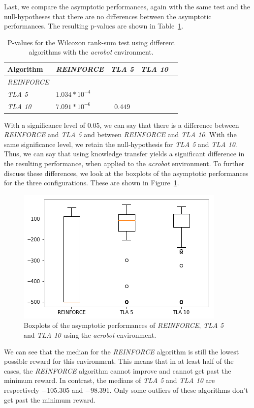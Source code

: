 Last, we compare the asymptotic performances, again with the same test and the null-hypotheses that there are no differences between the asymptotic performances. The resulting p-values are shown in Table~\ref{tab:nosparse:asymp:pvalues}.
\begin{table}[htb]
    \centering
    \begin{tabular}{llccc}
    \hline
    Algorithm & \textit{REINFORCE} & \textit{TLA 5} & \textit{TLA 10} \\
    \hline
       \textit{REINFORCE}  & & & \\
       \textit{TLA 5} & $1.034*10^{-4}$ & & \\
       \textit{TLA 10} & $7.091*10^{-6}$ & $0.449$ & \\
    \hline
    \end{tabular}
    \caption{P-values for the Wilcoxon rank-sum test using different algorithms with the \textit{acrobot} environment.}
    \label{tab:nosparse:asymp:pvalues}
\end{table}

With a significance level of $0.05$, we can say that there is a difference between \textit{REINFORCE} and \textit{TLA 5} and between \textit{REINFORCE} and \textit{TLA 10}.
With the same significance level, we retain the null-hypothesis for \textit{TLA 5} and \textit{TLA 10}.
Thus, we can say that using knowledge transfer yields a significant difference in the resulting performance, when applied to the \textit{acrobot} environment.
To further discuss these differences, we look at the boxplots of the asymptotic performances for the three configurations. These are shown in Figure~\ref{fig:nosparse:Acrobot:asymp_target_re-akt5-akt10}.
\begin{figure}[htb]
    \centering
    \includegraphics[width=.8\linewidth]{images/results/Acrobot/no_sparse_transfer/asymp_target_re-akt5-akt10.png}
    \caption{Boxplots of the asymptotic performances of \textit{REINFORCE}, \textit{TLA 5} and \textit{TLA 10} using the \textit{acrobot} environment.}
    \label{fig:nosparse:Acrobot:asymp_target_re-akt5-akt10}
\end{figure}
We can see that the median for the \textit{REINFORCE} algorithm is still the lowest possible reward for this environment. This means that in at least half of the cases, the \textit{REINFORCE} algorithm cannot improve and cannot get past the minimum reward. In contrast, the medians of \textit{TLA 5} and \textit{TLA 10} are respectively $-105.305$ and $-98.391$. Only some outliers of these algorithms don't get past the minimum reward.

